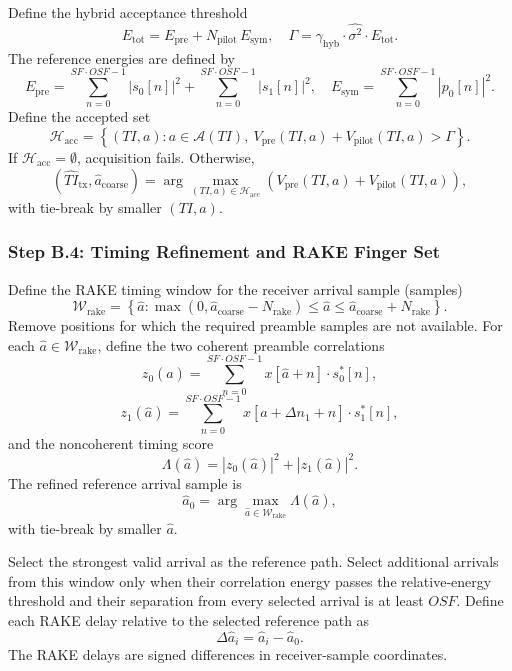 \documentclass[11pt]{article}
\begin{document}
Define the hybrid acceptance threshold
\[
  E_{\text{tot}} = E_{\text{pre}} + N_{\text{pilot}}\,E_{\text{sym}},\quad
  \Gamma = \gamma_{\text{hyb}}\cdot \widehat{\sigma^2}\cdot E_{\text{tot}}.
\]
The reference energies are defined by
\[
  E_{\text{pre}}=\sum_{n=0}^{\mathit{SF}\cdot\mathit{OSF}-1}|s_0[n]|^2+\sum_{n=0}^{\mathit{SF}\cdot\mathit{OSF}-1}|s_1[n]|^2,\quad
  E_{\text{sym}}=\sum_{n=0}^{\mathit{SF}\cdot\mathit{OSF}-1}|p_0[n]|^2.
\]
Define the accepted set
\[
  \mathcal{H}_{\text{acc}}=\left\{(\mathit{TI},a): a\in\mathcal{A}(\mathit{TI}),\ V_{\text{pre}}(\mathit{TI},a)+V_{\text{pilot}}(\mathit{TI},a)>\Gamma\right\}.
\]
If $\mathcal{H}_{\text{acc}}=\emptyset$, acquisition fails. Otherwise,
\[
  (\widehat{\mathit{TI}}_{\text{tx}},\hat a_{\text{coarse}})=\arg\max_{(\mathit{TI},a)\in\mathcal{H}_{\text{acc}}}\left(V_{\text{pre}}(\mathit{TI},a)+V_{\text{pilot}}(\mathit{TI},a)\right),
\]
with tie-break by smaller $(\mathit{TI},a)$.

\subsubsection{Step B.4: Timing Refinement and RAKE Finger Set}

Define the RAKE timing window for the receiver arrival sample (samples)
\[
  \mathcal{W}_{\text{rake}}=\left\{\hat a:\max(0,\hat a_{\text{coarse}}-N_{\text{rake}})\le \hat a
  \le \hat a_{\text{coarse}}+N_{\text{rake}}\right\}.
\]
Remove positions for which the required preamble samples are not available. For each
$\hat a\in\mathcal{W}_{\text{rake}}$, define the two coherent preamble correlations
\[
  z_0(\hat a)=\sum_{n=0}^{\mathit{SF}\cdot\mathit{OSF}-1} x[\hat a+n]\cdot s_0^*[n],
\]
\[
  z_1(\hat a)=\sum_{n=0}^{\mathit{SF}\cdot\mathit{OSF}-1} x[\hat a+\Delta n_1+n]\cdot s_1^*[n],
\]
and the noncoherent timing score
\[
  \Lambda(\hat a)=|z_0(\hat a)|^2+|z_1(\hat a)|^2.
\]
The refined reference arrival sample is
\[
  \hat a_0=\arg\max_{\hat a\in\mathcal{W}_{\text{rake}}}\Lambda(\hat a),
\]
with tie-break by smaller $\hat a$.

Select the strongest valid arrival as the reference path. Select additional arrivals from this
window only when their correlation energy passes the relative-energy threshold and
their separation from every selected arrival is at least $\mathit{OSF}$. Define each RAKE delay
relative to the selected reference path as
\[
  \Delta \hat a_i=\hat a_i-\hat a_0.
\]
The RAKE delays are signed differences in receiver-sample coordinates.
\end{document}
